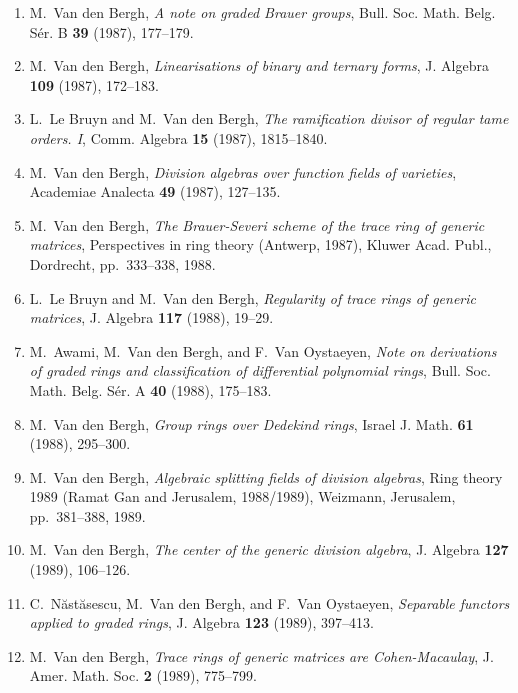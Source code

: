 \begin{enumerate}
\item
M.~Van den Bergh, {\em A note on graded Brauer groups}, Bull. Soc. Math. Belg. S\'er. B {\bf 39} (1987), 177--179.

\item
M.~Van den Bergh, {\em Linearisations of binary and ternary forms}, J. Algebra {\bf 109} (1987), 172--183.

\item
L.~Le Bruyn and M.~Van den Bergh, {\em The ramification divisor of regular tame orders. I}, Comm. Algebra {\bf 15} (1987), 1815--1840.

\item
M.~Van den Bergh, {\em Division algebras over function fields of varieties}, Academiae Analecta {\bf 49} (1987), 127--135.

\item
M.~Van den Bergh, {\em The Brauer-Severi scheme of the trace ring of generic matrices}, Perspectives in ring theory (Antwerp, 1987), Kluwer Acad. Publ., Dordrecht, pp.~333--338, 1988.

\item
L.~Le Bruyn and M.~Van den Bergh, {\em Regularity of trace rings of generic matrices}, J. Algebra {\bf 117} (1988), 19--29.

\item
M.~Awami, M.~Van den Bergh, and F.~Van Oystaeyen, {\em Note on derivations of graded rings and classification of differential polynomial rings}, Bull. Soc. Math. Belg. S\'er. A {\bf 40} (1988), 175--183.

\item
M.~Van den Bergh, {\em Group rings over Dedekind rings}, Israel J. Math. {\bf 61} (1988), 295--300.

\item
M.~Van den Bergh, {\em Algebraic splitting fields of division algebras}, Ring theory 1989 (Ramat Gan and Jerusalem, 1988/1989), Weizmann, Jerusalem, pp.~381--388, 1989.

\item
M.~Van den Bergh, {\em The center of the generic division algebra}, J. Algebra {\bf 127} (1989), 106--126.

\item
C.~N{\u{a}}st{\u{a}}sescu, M.~Van den Bergh, and F.~Van Oystaeyen, {\em Separable functors applied to graded rings}, J. Algebra {\bf 123} (1989), 397--413.

\item
M.~Van den Bergh, {\em Trace rings of generic matrices are Cohen-Macaulay}, J. Amer. Math. Soc. {\bf 2} (1989), 775--799.


\end{enumerate}
